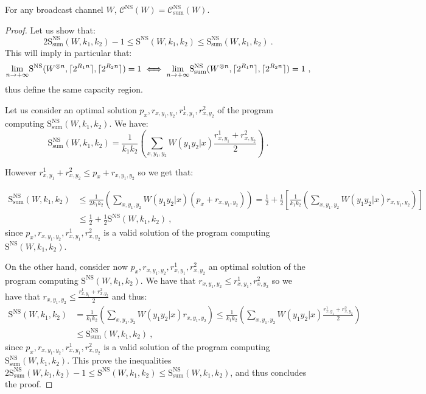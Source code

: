 \begin{prop}
    For any broadcast channel $W$, $\mathcal{C}^{\mathrm{NS}}(W) = \mathcal{C}^{\mathrm{NS}}_{\text{sum}}(W)$.
\end{prop}
\begin{proof}
Let us show that:
\[ 2 \mathrm{S}_{\text{sum}}^{\mathrm{NS}}(W,k_1,k_2)-1 \leq  \mathrm{S}^{\mathrm{NS}}(W,k_1,k_2) \leq \mathrm{S}_{\text{sum}}^{\mathrm{NS}}(W,k_1,k_2) \ . \]
This will imply in particular that:
\[ \underset{n \rightarrow +\infty}{\lim} \mathrm{S}^{\mathrm{NS}}(W^{\otimes n},\lceil2^{R_1n}\rceil,\lceil2^{R_2n}\rceil) = 1 \iff \underset{n \rightarrow +\infty}{\lim} \mathrm{S}^{\mathrm{NS}}_{\text{sum}}(W^{\otimes n},\lceil2^{R_1n}\rceil,\lceil2^{R_2n}\rceil) = 1 \ ,\]
thus define the same capacity region.

Let us consider an optimal solution $p_x,r_{x,y_1,y_2},r^1_{x,y_1},r^2_{x,y_2}$ of the program computing $\mathrm{S}_{\text{sum}}^{\mathrm{NS}}(W,k_1,k_2)$. We have:
\[ \mathrm{S}_{\text{sum}}^{\mathrm{NS}}(W,k_1,k_2) = \frac{1}{k_1k_2}\left(\sum_{x,y_1,y_2} W(y_1y_2|x)\frac{r^1_{x,y_1} + r^2_{x,y_2}}{2}\right) \ . \]

  However $r^1_{x,y_1} + r^2_{x,y_2} \leq p_x + r_{x,y_1,y_2}$ so we get that:

  \begin{equation}
    \begin{aligned}
      \mathrm{S}_{\text{sum}}^{\mathrm{NS}}(W,k_1,k_2) &\leq \frac{1}{2k_1k_2}\left(\sum_{x,y_1,y_2} W(y_1y_2|x)\left( p_x + r_{x,y_1,y_2}\right)\right)  = \frac{1}{2} + \frac{1}{2}\left[\frac{1}{k_1k_2}\left(\sum_{x,y_1,y_2} W(y_1y_2|x)r_{x,y_1,y_2}\right)\right]\\
      &\leq \frac{1}{2} + \frac{1}{2}\mathrm{S}^{\mathrm{NS}}(W,k_1,k_2) \ ,
    \end{aligned}
  \end{equation}
  since $p_x,r_{x,y_1,y_2},r^1_{x,y_1},r^2_{x,y_2}$ is a valid solution of the program computing $\mathrm{S}^{\mathrm{NS}}(W,k_1,k_2)$.

  On the other hand, consider now $p_x,r_{x,y_1,y_2},r^1_{x,y_1},r^2_{x,y_2}$ an optimal solution of the program computing $\mathrm{S}^{\mathrm{NS}}(W,k_1,k_2)$. We have that $r_{x,y_1,y_2} \leq r^1_{x,y_1},r^2_{x,y_2}$ so we have that $r_{x,y_1,y_2} \leq \frac{r^1_{x,y_1}+r^2_{x,y_2}}{2}$ and thus:
  \begin{equation}
    \begin{aligned}
      \mathrm{S}^{\mathrm{NS}}(W,k_1,k_2) &= \frac{1}{k_1k_2}\left(\sum_{x,y_1,y_2} W(y_1y_2|x)r_{x,y_1,y_2}\right) \leq \frac{1}{k_1k_2}\left(\sum_{x,y_1,y_2} W(y_1y_2|x)\frac{r^1_{x,y_1}+r^2_{x,y_2}}{2}\right)\\
      &\leq \mathrm{S}_{\text{sum}}^{\mathrm{NS}}(W,k_1,k_2) \ ,
    \end{aligned}
  \end{equation}
  since $p_x,r_{x,y_1,y_2},r^1_{x,y_1},r^2_{x,y_2}$ is a valid solution of the program computing $\mathrm{S}^{\mathrm{NS}}_{\text{sum}}(W,k_1,k_2)$. This prove the inequalities $ 2 \mathrm{S}_{\text{sum}}^{\mathrm{NS}}(W,k_1,k_2)-1 \leq  \mathrm{S}^{\mathrm{NS}}(W,k_1,k_2) \leq \mathrm{S}_{\text{sum}}^{\mathrm{NS}}(W,k_1,k_2)$, and thus concludes the proof.
\end{proof}

